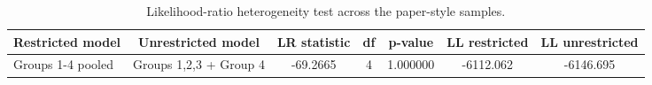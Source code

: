 \begin{table}[htbp]
\centering
\caption{Likelihood-ratio heterogeneity test across the paper-style samples.}
\label{tab:rust\_simplified\_heterogeneity}
\begin{tabular}{lcccccc}
\toprule
Restricted model & Unrestricted model & LR statistic & df & p-value & LL restricted & LL unrestricted \\
\midrule
Groups 1-4 pooled & Groups 1,2,3 + Group 4 & -69.2665 & 4 & 1.000000 & -6112.062 & -6146.695 \\
\bottomrule
\end{tabular}
\end{table}